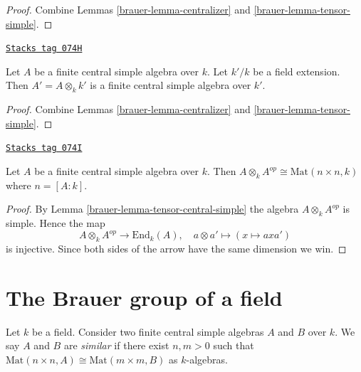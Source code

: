 \begin{proof}

Combine Lemmas \ref{brauer-lemma-centralizer} and \ref{brauer-lemma-tensor-simple}.
\end{proof}

\begin{lemma}
\label{brauer-lemma-base-change}
\href{https://stacks.math.columbia.edu/tag/074H}{\texttt{Stacks tag 074H}}

Let $A$ be a finite central simple algebra over $k$.
Let $k'/k$ be a field extension. Then $A' = A \otimes_k k'$ is
a finite central simple algebra over $k'$.
\end{lemma}

\begin{proof}

Combine Lemmas \ref{brauer-lemma-centralizer} and \ref{brauer-lemma-tensor-simple}.
\end{proof}

\begin{lemma}[Inverse]
\label{brauer-lemma-inverse}
\href{https://stacks.math.columbia.edu/tag/074I}{\texttt{Stacks tag 074I}}

Let $A$ be a finite central simple algebra over $k$.
Then $A \otimes_k A^{op} \cong \text{Mat}(n \times n, k)$
where $n = [A : k]$.
\end{lemma}

\begin{proof}

By Lemma \ref{brauer-lemma-tensor-central-simple} the algebra $A \otimes_k A^{op}$
is simple. Hence the map
$$
A \otimes_k A^{op} \longrightarrow \text{End}_k(A),\quad
a \otimes a' \longmapsto (x \mapsto axa')
$$
is injective. Since both sides of the arrow have the same dimension
we win.
\end{proof}

\section{The Brauer group of a field}
\label{brauer-section-brauer}
Let $k$ be a field. Consider two finite central simple algebras
$A$ and $B$ over $k$. We say $A$ and $B$ are {\it similar} if there
exist $n, m > 0$ such that
$\text{Mat}(n \times n, A) \cong \text{Mat}(m \times m, B)$
as $k$-algebras.

